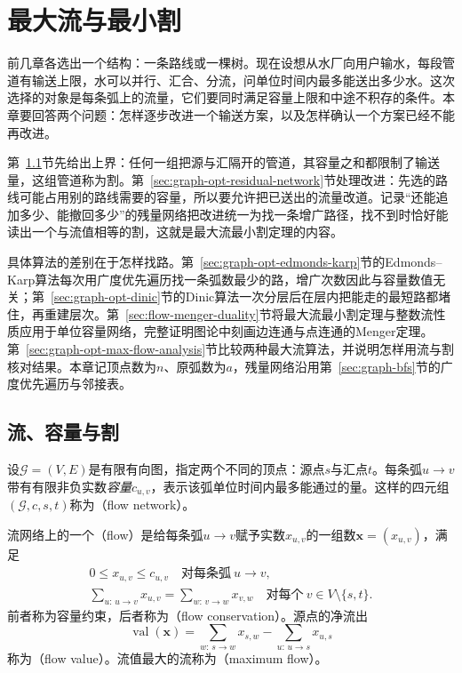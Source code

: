 
\chapter{最大流与最小割}
\label{sec:graph-max-flow}
\label{chap:max-flow-min-cut}

前几章各选出一个结构：一条路线或一棵树。现在设想从水厂向用户输水，每段管道有输送上限，水可以并行、汇合、分流，问单位时间内最多能送出多少水。这次选择的对象是每条弧上的流量，它们要同时满足容量上限和中途不积存的条件。本章要回答两个问题：怎样逐步改进一个输送方案，以及怎样确认一个方案已经不能再改进。

第~\ref{sec:graph-opt-flow-cut}节先给出上界：任何一组把源与汇隔开的管道，其容量之和都限制了输送量，这组管道称为割。第~\ref{sec:graph-opt-residual-network}节处理改进：先选的路线可能占用别的路线需要的容量，所以要允许把已送出的流量改道。记录“还能追加多少、能撤回多少”的残量网络把改进统一为找一条增广路径，找不到时恰好能读出一个与流值相等的割，这就是最大流最小割定理的内容。

具体算法的差别在于怎样找路。第~\ref{sec:graph-opt-edmonds-karp}节的Edmonds--Karp算法每次用广度优先遍历找一条弧数最少的路，增广次数因此与容量数值无关；第~\ref{sec:graph-opt-dinic}节的Dinic算法一次分层后在层内把能走的最短路都堵住，再重建层次。第~\ref{sec:flow-menger-duality}节将最大流最小割定理与整数流性质应用于单位容量网络，完整证明图论中刻画边连通与点连通的Menger定理。第~\ref{sec:graph-opt-max-flow-analysis}节比较两种最大流算法，并说明怎样用流与割核对结果。本章记顶点数为$n$、原弧数为$a$，残量网络沿用第~\ref{sec:graph-bfs}节的广度优先遍历与邻接表。

\section{流、容量与割}
\label{sec:graph-opt-flow-cut}

设$\mathcal G=(V,E)$是有限有向图，指定两个不同的顶点：源点$s$与汇点$t$。每条弧$u\to v$带有有限非负实数\emph{容量}$c_{u,v}$，表示该弧单位时间内最多能通过的量。这样的四元组$(\mathcal G,c,s,t)$称为（flow network）。

\begin{definition}[流与流值]
\label{def:graph-opt-flow}
流网络上的一个（flow）是给每条弧$u\to v$赋予实数$x_{u,v}$的一组数$\bm x=(x_{u,v})$，满足
\begin{gather}
  0\leq x_{u,v}\leq c_{u,v}\quad\text{对每条弧}\ u\to v,\label{eq:graph-opt-capacity}\\
  \sum_{u:\,u\to v}x_{u,v}=\sum_{w:\,v\to w}x_{v,w}\quad\text{对每个}\ v\in V\setminus\{s,t\}.\label{eq:graph-opt-conservation}
\end{gather}
前者称为容量约束，后者称为（flow conservation）。源点的净流出
\begin{equation}
  \operatorname{val}(\bm x)=\sum_{w:\,s\to w}x_{s,w}-\sum_{u:\,u\to s}x_{u,s}
  \label{eq:graph-opt-flow-value}
\end{equation}
称为（flow value）。流值最大的流称为（maximum flow）。
\end{definition}

